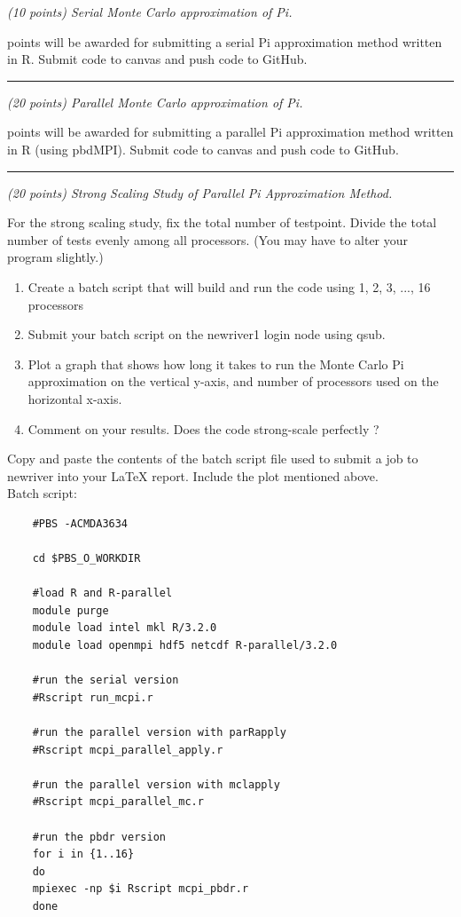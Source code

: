 \documentclass{article}
\newcommand{\myhrule}{ \begin{center}\rule{.9\linewidth}{.25mm}\end{center} }
\newcommand{\pad}{\vspace{8pt}\noindent}
\begin{document}
\newpage




\pad {\bf Q1} {\it (10 points) Serial Monte Carlo approximation of Pi.}
\vspace{8pt} 

 points will be awarded for submitting a serial Pi approximation method written in R. Submit code to canvas and push code to GitHub.

\myhrule

\pad {\bf Q2} {\it (20 points) Parallel Monte Carlo approximation of Pi.}
\vspace{8pt} 

 points will be awarded for submitting a parallel Pi approximation method written in R (using pbdMPI). Submit code to canvas and push code to GitHub.

\myhrule

\pad {\bf Q3} {\it (20 points) Strong Scaling Study of Parallel Pi Approximation Method.}
\vspace{8pt} 

\noindent For the strong scaling study, fix the total number of testpoint. Divide the total number of tests evenly among all processors. (You may have to alter your program slightly.) 
\begin{enumerate}
    \item Create a batch script that will build and run the code using 1, 2, 3, ..., 16 processors
    \item Submit your batch script on the newriver1 login node using qsub. 
    \item Plot a graph that shows how long it takes to run the Monte Carlo Pi approximation on the vertical y-axis, and number of processors used on the horizontal x-axis.
    \item Comment on your results. Does the code strong-scale perfectly ?
\end{enumerate}

\noindent Copy and paste the contents of the batch script file used to submit a job to newriver into your \LaTeX{} report. Include the plot mentioned above.  \\

Batch script:
\begin{verbatim}
    #PBS -ACMDA3634

    cd $PBS_O_WORKDIR
    
    #load R and R-parallel
    module purge
    module load intel mkl R/3.2.0
    module load openmpi hdf5 netcdf R-parallel/3.2.0
    
    #run the serial version
    #Rscript run_mcpi.r
    
    #run the parallel version with parRapply
    #Rscript mcpi_parallel_apply.r
    
    #run the parallel version with mclapply
    #Rscript mcpi_parallel_mc.r
    
    #run the pbdr version
    for i in {1..16}
    do
    mpiexec -np $i Rscript mcpi_pbdr.r
    done
\end{verbatim}
\end{document}
